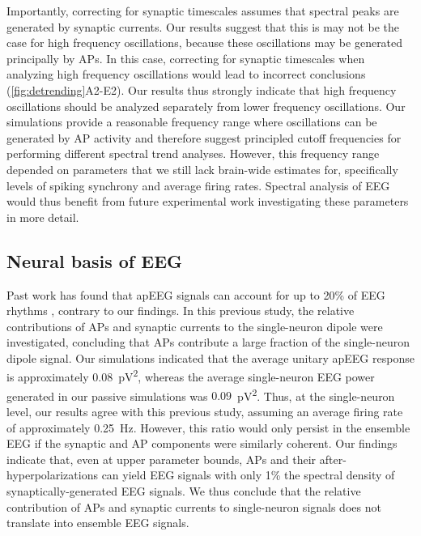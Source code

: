 Importantly, correcting for synaptic timescales assumes that spectral peaks are generated by synaptic currents. Our results suggest that this is may not be the case for high frequency oscillations, because these oscillations may be generated principally by APs. In this case, correcting for synaptic timescales when analyzing high frequency oscillations would lead to incorrect conclusions ({\autoref{fig:detrending}A2-E2}). Our results thus strongly indicate that high frequency oscillations should be analyzed separately from lower frequency oscillations. Our simulations provide a reasonable frequency range where oscillations can be generated by AP activity and therefore suggest principled cutoff frequencies for performing different spectral trend analyses. However, this frequency range depended on parameters that we still lack brain-wide estimates for, specifically levels of spiking synchrony and average firing rates. Spectral analysis of EEG would thus benefit from future experimental work investigating these parameters in more detail.
 
\subsection{Neural basis of EEG}
Past work has found that apEEG signals can account for up to 20\% of EEG rhythms \cite{Thio2023}, contrary to our findings. In this previous study, the relative contributions of APs and synaptic currents to the single-neuron dipole were investigated, concluding that APs contribute a large fraction of the single-neuron dipole signal. Our simulations indicated that the average unitary apEEG response is approximately $0.08$~\unit{\pico\volt^2}, whereas the average single-neuron EEG power generated in our passive simulations was $0.09$~\unit{\pico\volt^2}. Thus, at the single-neuron level, our results agree with this previous study, assuming an average firing rate of approximately \qty{0.25}{\hertz}. However, this ratio would only persist in the ensemble EEG if the synaptic and AP components were similarly coherent. Our findings indicate that, even at upper parameter bounds, APs and their after-hyperpolarizations can yield EEG signals with only 1\% the spectral density of synaptically-generated EEG signals. We thus conclude that the relative contribution of APs and synaptic currents to single-neuron signals does not translate into ensemble EEG signals.

